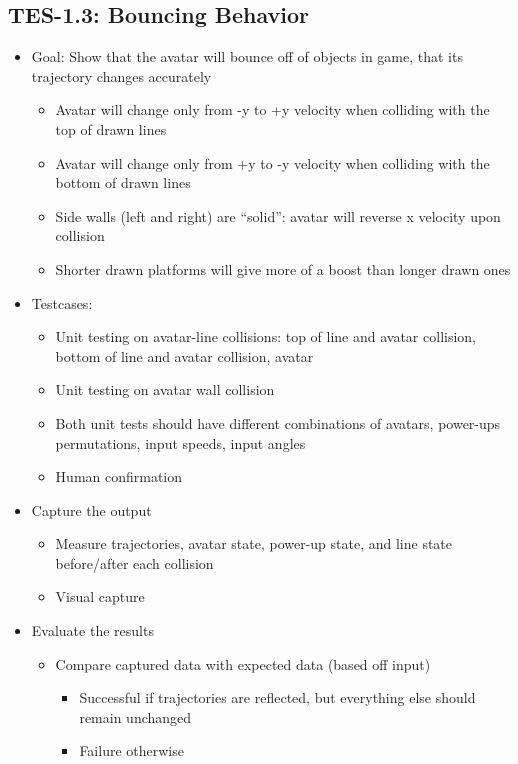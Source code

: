 \subsection{TES-1.3: Bouncing Behavior}
\label{subsec:bounce}
\begin{itemize}
\item Goal: Show that the avatar will bounce off of objects in game, that its trajectory changes accurately

\begin{itemize}
\item Avatar will change only from -y to +y velocity when colliding with the top of drawn lines
\item Avatar will change only from +y to -y velocity when colliding with the bottom of drawn lines
\item Side walls (left and right) are \textquotedblleft{}solid\textquotedblright{}: avatar will reverse x velocity upon collision
\item Shorter drawn platforms will give more of a boost than longer drawn ones
\end{itemize}

\item Testcases: 
\begin{itemize}
\item Unit testing on avatar-line collisions: top of line and avatar collision, bottom of line and avatar collision, avatar 
\item Unit testing on avatar wall collision 
\item Both unit tests should have different combinations of avatars, power-ups permutations, input speeds, input angles
\item Human confirmation 
\end{itemize}

\item Capture the output 
\begin{itemize}
\item Measure trajectories, avatar state, power-up state, and line state before/after each collision 
\item Visual capture 
\end{itemize}

\item Evaluate the results
\begin{itemize}
\item Compare captured data with expected data (based off input)
\begin{itemize}
\item Successful if trajectories are reflected, but everything else should remain unchanged
\item Failure otherwise
\end{itemize}
\end{itemize}


\end{itemize}
